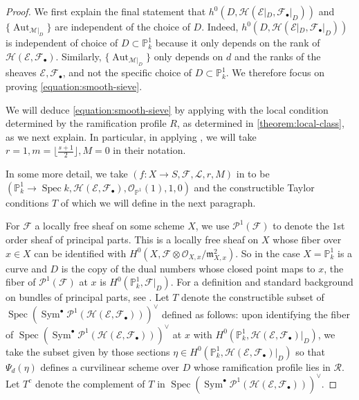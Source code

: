 \documentclass[12 pt]{amsart}
\theoremstyle{plain}
\theoremstyle{definition}
\theoremstyle{remark}
\numberwithin{equation}{section}
\newcommand\bp{\mathbb P}
\newcommand\sce{\mathscr E}
\newcommand\scf{\mathscr F}
\newcommand\sch{\mathscr H}
\newcommand\sco{\mathscr O}
\DeclareMathOperator\spec{\operatorname{Spec}}
\newcommand\ce{\mathscr M} %
\DeclareMathOperator\sym{Sym}
\DeclareMathOperator\aut{Aut}
\begin{document}
\begin{proof} 
We first explain the final statement that $h^0(D, \sch(\sce|_D, \scf_\bullet|_D))$ and 
$\{\aut_{\ce|_D}\}$
are independent
of the choice of $D$.
Indeed, $h^0(D, \sch(\sce|_D, \scf_\bullet|_D))$ is independent of choice of $D \subset \mathbb P^1_k$
because it only
depends on the rank of $\sch(\sce, \scf_\bullet)$.
Similarly, $\{\aut_{\ce|_D}\}$ only depends on $d$ and the ranks of the sheaves $\sce,
\scf_\bullet$, and not the specific choice of $D \subset \mathbb P^1_k$.
We therefore focus on proving \eqref{equation:smooth-sieve}.

We will deduce \eqref{equation:smooth-sieve}
by applying \cite[Thm.\
9.3.1]{biluH:motivic-euler-products-in-motivic-statistics} with the local
condition determined by the ramification profile $R$, as
determined in \autoref{theorem:local-class}, as we next explain.  
In particular, in applying 
\cite[Thm.\
9.3.1]{biluH:motivic-euler-products-in-motivic-statistics},
we will take $r = 1, m = \lfloor \frac{s + 1}{2} \rfloor, M = 0$ in their
notation.

In some more
detail, we take $(f: X \to S, \mathcal F, \mathcal L, r, M)$ in
\cite[Thm.\  9.3.1]{biluH:motivic-euler-products-in-motivic-statistics} 
to be $(\bp^1_k \to \spec k, \sch(\sce, \scf_\bullet),\sco_{\bp^1}(1),1,0)$ and the
constructible Taylor conditions $T$ of \cite[Thm.\
9.3.1]{biluH:motivic-euler-products-in-motivic-statistics} which we will define
in the next paragraph.

For $\mathscr F$ a locally free sheaf on some scheme $X$, we use $\mathcal P^1(\mathscr F)$
to denote the $1$st order sheaf of principal parts. 
This is a locally free sheaf on $X$ whose fiber over $x \in X$ can be identified
with $H^0(X, \mathscr F \otimes \mathscr O_{X,x}/\mathfrak m_{X,x}^2)$.
So in the case $X = \mathbb P^1_k$ is a curve and $D$ is the copy of the dual numbers whose
closed point maps to $x$, the fiber of $\mathcal P^1(\mathscr F)$ at $x$ is
$H^0(\mathbb P^1_k, \mathscr F|_D)$.
For a definition and standard background on bundles of principal parts, see
\cite[\S7.2]{eisenbudH:3264-&-all-that}.
Let $T$ denote the constructible subset of 
$\spec \left( \sym^\bullet \mathcal P^1(\sch(\sce, \scf_\bullet)) \right)^\vee$
defined as follows:
upon identifying the fiber of 
$\spec \left( \sym^\bullet \mathcal P^1(\sch(\sce, \scf_\bullet)) \right)^\vee$
at $x$ with 
$H^0(\mathbb P^1_k, \sch(\sce, \scf_\bullet)|_D)$, we take the subset given by those
sections $\eta \in H^0(\mathbb P^1_k, \sch(\sce, \scf_\bullet)|_D)$
so that $\Psi_d(\eta)$ defines a curvilinear scheme over $D$ whose ramification
profile lies in $\mathcal R$.
Let $T^c$ denote the complement of $T$ in 
$\spec \left( \sym^\bullet \mathcal P^1(\sch(\sce, \scf_\bullet)) \right)^\vee$.


\end{proof}
\end{document}

